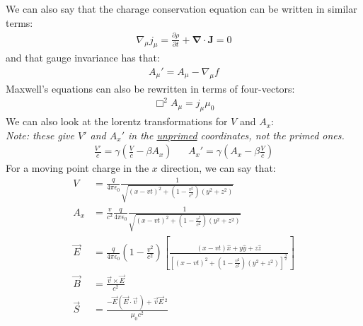 \documentclass{article}
\begin{document}
We can also say that the charage conservation equation can be 
written in similar terms:
\begin{align*}
    \nabla_\mu j_\mu = \frac{\partial \rho}{\partial t} + \pmb{\nabla} \cdot \mathbf{J} = 0
\end{align*}
and that gauge invariance has that:
\begin{align*}
    A_\mu' = A_\mu - \nabla_\mu f
\end{align*}
Maxwell's equations can also be rewritten in terms of four-vectors:
\begin{align*}
    \Box^2 A_\mu = j_\mu \mu_0
\end{align*}
We can also look at the lorentz transformations for $V$ and $A_x$:\\
\textit{Note: these give $V'$ and $A_x'$ in the \underline{unprimed} coordinates, not the primed ones.}
\begin{align*}
    \frac{V'}{c} = \gamma \left(\frac{V}{c} - \beta A_x\right) && A_x' = \gamma\left(A_x - \beta \frac{V}{c}\right)
\end{align*}
For a moving point charge in the $x$ direction, we can say that:
\begin{align*}
    V &= \frac{q}{4\pi \epsilon_0} \frac{1}{\sqrt{(x-vt)^2 + \left(1 - \frac{v^2}{c^2}\right) (y^2 + z^2)}}\\
    A_x &=\frac{v}{c^2}\frac{q}{4\pi \epsilon_0} \frac{1}{\sqrt{(x-vt)^2 + \left(1 - \frac{v^2}{c^2}\right) (y^2 + z^2)}}\\
    \vec{E} &= \frac{q}{4\pi \epsilon_0}\left(1 - \frac{v^2}{c^2}\right) \left[
        \frac{(x-vt) \hat{x} + y\hat{y} + z \hat{z}}
        {\left[(x-vt)^2 + \left(1- \frac{v^2}{c^2}\right)(y^2 + z^2)\right]^{\frac{3}{2}}}
    \right]
    \\
    \vec{B} &= \frac{\vec{v} \times \vec{E}}{c^2}\\
    \vec{S} &= \frac{-\vec{E} (\vec{E} \cdot \vec{v}\,) + \vec{v}\vec{E}\,^2}{\mu_0 c^2}
\end{align*}
\end{document}
